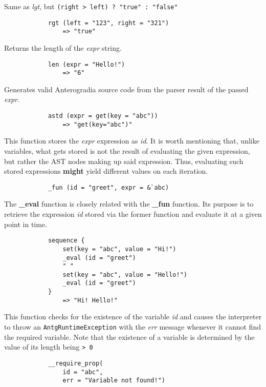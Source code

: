 \begin{multicols*}{2}
	Same as \textit{lgt}, but \verb|(right > left) ? "true" : "false"|
	\begin{verbatim}
			rgt (left = "123", right = "321")
			    => "true"
	\end{verbatim}
	Returns the length of the \textit{expr} string.
	\begin{verbatim}
			len (expr = "Hello!")
			    => "6"
	\end{verbatim}
	\columnbreak
	Generates valid Anterogradia source code from the parser result of the passed \textit{expr}.
	\begin{verbatim}
			astd (expr = get(key = "abc"))
			    => "get(key="abc")"
	\end{verbatim}
	\spacing
	This function stores the \textit{expr} expression as \textit{id}. It is worth mentioning that, unlike variables,
	what gets stored is not the result of evaluating the given expression, but rather the AST nodes making up said expression.
	Thus, evaluating such stored expressions \textbf{might} yield different values on each iteration.
	\begin{verbatim}
			_fun (id = "greet", expr = &`abc)
	\end{verbatim}
	\spacing
	The \textbf{\_eval} function is closely related with the \textbf{\_fun} function. Its purpose is to retrieve the expression \textit{id} stored via the
	former function and evaluate it at a given point in time.
	\begin{verbatim}
			sequence {
			    set(key = "abc", value = "Hi!")
			    _eval (id = "greet")
			    " "
			    set(key = "abc", value = "Hello!")
			    _eval (id = "greet")
			}
			    => "Hi! Hello!"
	\end{verbatim}
	This function checks for the existence of the variable \textit{id} and causes the interpreter to throw an \verb|AntgRuntimeException|
	with the \textit{err} message whenever it cannot find the required variable. Note that the existence of a variable is determined by the
	value of its length being \verb|> 0|
	\begin{verbatim}
			__require_prop(
			    id = "abc",
			    err = "Variable not found!")


\end{verbatim}
\end{multicols*}
